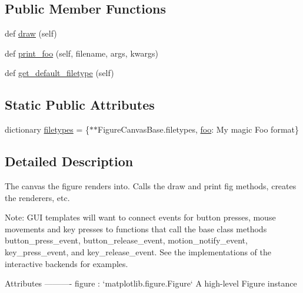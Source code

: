 \subsection*{Public Member Functions}
\begin{DoxyCompactItemize}
\item 
def \hyperlink{classmatplotlib_1_1backends_1_1backend__template_1_1FigureCanvasTemplate_a87aeb5dea0cb776a35f1707ba788291d}{draw} (self)
\item 
def \hyperlink{classmatplotlib_1_1backends_1_1backend__template_1_1FigureCanvasTemplate_a225fa67f3e366b2ff15839a6e5532427}{print\+\_\+foo} (self, filename, args, kwargs)
\item 
def \hyperlink{classmatplotlib_1_1backends_1_1backend__template_1_1FigureCanvasTemplate_a96adc0da4ecff8e4823a2a371c8a9174}{get\+\_\+default\+\_\+filetype} (self)
\end{DoxyCompactItemize}
\subsection*{Static Public Attributes}
\begin{DoxyCompactItemize}
\item 
dictionary \hyperlink{classmatplotlib_1_1backends_1_1backend__template_1_1FigureCanvasTemplate_ab9cdc635dc04f51bd9afc9e93d54660d}{filetypes} = \{$\ast$$\ast$Figure\+Canvas\+Base.\+filetypes, \textquotesingle{}\hyperlink{size_2foo_8f90_a6e9dfcbd55e5ab1066524746915b4f19}{foo}\textquotesingle{}\+: \textquotesingle{}My magic Foo format\textquotesingle{}\}
\end{DoxyCompactItemize}


\subsection{Detailed Description}
\begin{DoxyVerb}The canvas the figure renders into.  Calls the draw and print fig
methods, creates the renderers, etc.

Note: GUI templates will want to connect events for button presses,
mouse movements and key presses to functions that call the base
class methods button_press_event, button_release_event,
motion_notify_event, key_press_event, and key_release_event.  See the
implementations of the interactive backends for examples.

Attributes
----------
figure : `matplotlib.figure.Figure`
    A high-level Figure instance
\end{DoxyVerb}
 

